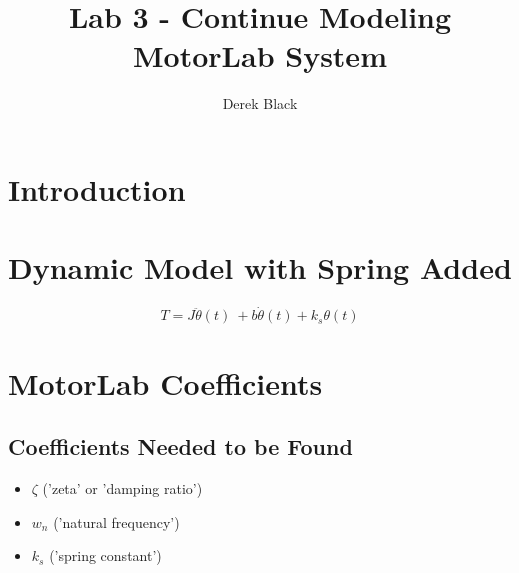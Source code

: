 \documentclass[11pt, oneside]{article}   	%
\title{\vspace{-3.0cm}Lab 3 - Continue Modeling MotorLab System}
\author{Derek Black}
\date{\vspace{-5ex}}
\begin{document}
\maketitle

\section{Introduction}

\section{Dynamic Model with Spring Added}

\[T = J \ddot \theta(t) \ + b \dot \theta(t) + k_s \theta(t) \]

\section{MotorLab Coefficients}

\subsection{Coefficients Needed to be Found}
\begin{itemize}
\item \(\zeta\)    ('zeta' or 'damping ratio')
\item \(w_n\)     ('natural frequency')
\item \(k_s\)      ('spring constant')
\end{itemize}
\end{document}
